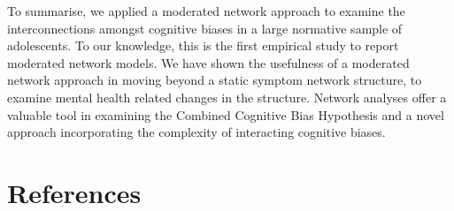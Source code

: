 \documentclass[
  english,
  man]{apa6}
\begin{document}
To summarise, we applied a moderated network approach to examine the interconnections amongst cognitive biases in a large normative sample of adolescents. To our knowledge, this is the first empirical study to report moderated network models. We have shown the usefulness of a moderated network approach in moving beyond a static symptom network structure, to examine mental health related changes in the structure. Network analyses offer a valuable tool in examining the Combined Cognitive Bias Hypothesis and a novel approach incorporating the complexity of interacting cognitive biases.

\newpage

\hypertarget{references}{%
\section{References}\label{references}}

\begingroup
\setlength{\parindent}{-0.5in}
\setlength{\leftskip}{0.5in}
\setlength{\parskip}{8pt}
\end{document}
